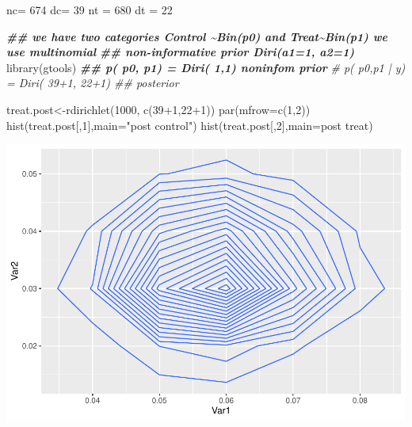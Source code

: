 \documentclass[
]{book}
\newenvironment{Shaded}{\begin{snugshade}}{\end{snugshade}}
\newcommand{\AttributeTok}[1]{\textcolor[rgb]{0.77,0.63,0.00}{#1}}
\newcommand{\CommentTok}[1]{\textcolor[rgb]{0.56,0.35,0.01}{\textit{#1}}}
\newcommand{\DecValTok}[1]{\textcolor[rgb]{0.00,0.00,0.81}{#1}}
\newcommand{\DocumentationTok}[1]{\textcolor[rgb]{0.56,0.35,0.01}{\textbf{\textit{#1}}}}
\newcommand{\FunctionTok}[1]{\textcolor[rgb]{0.00,0.00,0.00}{#1}}
\newcommand{\NormalTok}[1]{#1}
\newcommand{\OtherTok}[1]{\textcolor[rgb]{0.56,0.35,0.01}{#1}}
\newcommand{\SpecialCharTok}[1]{\textcolor[rgb]{0.00,0.00,0.00}{#1}}
\newcommand{\StringTok}[1]{\textcolor[rgb]{0.31,0.60,0.02}{#1}}
\theoremstyle{definition}
\theoremstyle{definition}
\theoremstyle{definition}
\theoremstyle{definition}
\theoremstyle{remark}
\begin{document}
\begin{Shaded}
\begin{Highlighting}[]
\NormalTok{ nc}\OtherTok{=} \DecValTok{674}
\NormalTok{ dc}\OtherTok{=} \DecValTok{39}
\NormalTok{ nt }\OtherTok{=} \DecValTok{680}
\NormalTok{ dt }\OtherTok{=} \DecValTok{22}

 
 
 \DocumentationTok{\#\# we have two categories Control \textasciitilde{}Bin(p0) and Treat\textasciitilde{}Bin(p1) we use multinomial}
 \DocumentationTok{\#\# non{-}informative prior Diri(a1=1, a2=1)}
 \FunctionTok{library}\NormalTok{(gtools)}
  \DocumentationTok{\#\# p( p0, p1) = Diri( 1,1) noninfom prior}
  \CommentTok{\# p( p0,p1 | y) = Diri(  39+1, 22+1) \#\#  posterior}
 
\NormalTok{ treat.post}\OtherTok{\textless{}{-}}\FunctionTok{rdirichlet}\NormalTok{(}\DecValTok{1000}\NormalTok{, }\FunctionTok{c}\NormalTok{(}\DecValTok{39}\SpecialCharTok{+}\DecValTok{1}\NormalTok{,}\DecValTok{22}\SpecialCharTok{+}\DecValTok{1}\NormalTok{))}
 \FunctionTok{par}\NormalTok{(}\AttributeTok{mfrow=}\FunctionTok{c}\NormalTok{(}\DecValTok{1}\NormalTok{,}\DecValTok{2}\NormalTok{))}
  \FunctionTok{hist}\NormalTok{(treat.post[,}\DecValTok{1}\NormalTok{],}\AttributeTok{main=}\StringTok{"post control"}\NormalTok{)}
  \FunctionTok{hist}\NormalTok{(treat.post[,}\DecValTok{2}\NormalTok{],}\AttributeTok{main=}\StringTok{\textquotesingle{}post treat\textquotesingle{}}\NormalTok{)}
\end{Highlighting}
\end{Shaded}

\includegraphics{_main_files/figure-latex/unnamed-chunk-33-1.pdf}
\end{document}
